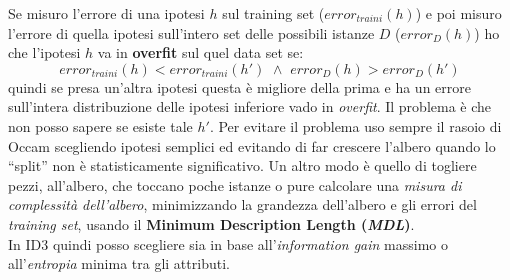 \documentclass[a4paper,12pt, oneside]{book}
\begin{document}
Se misuro l'errore di una ipotesi
$h$ sul training set ($error_{traini}(h)$) e poi misuro l'errore di quella
ipotesi sull'intero set delle possibili istanze
$D$ ($error_D(h)$) ho che l'ipotesi $h$ va in \textbf{overfit} sul quel data set
se:
\[error_{traini}(h) < error_{traini}(h') \,\,\land
  \,\,error_D(h)>error_D(h')\]
quindi se presa un'altra ipotesi questa è migliore della prima e ha un errore
sull'intera distribuzione delle ipotesi inferiore vado in \textit{overfit}. Il
problema è che non posso sapere se esiste tale $h'$. Per evitare il problema uso
sempre il rasoio di Occam scegliendo ipotesi semplici ed evitando di far
crescere l'albero quando lo ``split'' non è statisticamente significativo. Un
altro modo è quello di togliere pezzi, all'albero, che toccano poche istanze o
pure calcolare una \textit{misura di complessità dell'albero}, minimizzando la
grandezza dell'albero e gli errori del \textit{training set}, usando il
\textbf{Minimum Description Length (\textit{MDL})}.\\
In ID3 quindi posso scegliere sia in base all'\textit{information gain} massimo
o all'\textit{entropia} minima tra gli attributi.
\end{document}
